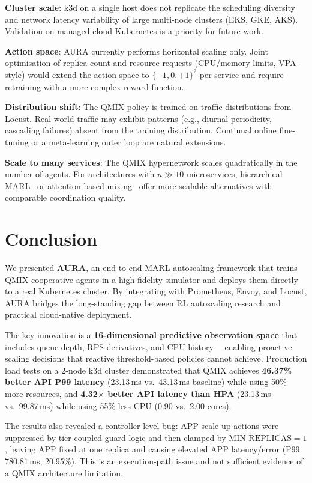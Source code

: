 \documentclass[conference]{IEEEtran}
\begin{document}
\textbf{Cluster scale}: k3d on a single host does not replicate
the scheduling diversity and network latency variability of large
multi-node clusters (EKS, GKE, AKS). Validation on managed cloud
Kubernetes is a priority for future work.

\textbf{Action space}: AURA currently performs horizontal scaling
only. Joint optimisation of replica count and resource requests
(CPU/memory limits, VPA-style) would extend the action space to
$\{-1,0,+1\}^2$ per service and require retraining with a more
complex reward function.

\textbf{Distribution shift}: The QMIX policy is trained on traffic
distributions from Locust. Real-world traffic may exhibit
patterns (e.g., diurnal periodicity, cascading failures) absent from
the training distribution. Continual online fine-tuning or a
meta-learning outer loop are natural extensions.

\textbf{Scale to many services}: The QMIX hypernetwork scales
quadratically in the number of agents. For architectures with
$n \gg 10$ microservices, hierarchical MARL~\cite{Pateria2021} or
attention-based mixing~\cite{Iqbal2019} offer more scalable
alternatives with comparable coordination quality.

\section{Conclusion}
\label{sec:conclusion}

We presented \textbf{AURA}, an end-to-end MARL autoscaling framework
that trains QMIX cooperative agents in a high-fidelity simulator and
deploys them directly to a real Kubernetes cluster. By integrating
with Prometheus, Envoy, and Locust, AURA bridges the long-standing
gap between RL autoscaling research and practical cloud-native
deployment.

The key innovation is a \textbf{16-dimensional predictive observation
space} that includes queue depth, RPS derivatives, and CPU history---
enabling proactive scaling decisions that reactive threshold-based
policies cannot achieve. Production load tests on a 2-node k3d cluster
demonstrated that QMIX achieves \textbf{46.37\% better API P99 latency}
(23.13\,ms vs.\ 43.13\,ms baseline) while using 50\% more resources,
and \textbf{4.32$\times$ better API latency than HPA} (23.13\,ms vs.\
99.87\,ms) while using 55\% less CPU (0.90 vs.\ 2.00 cores).

The results also revealed a controller-level bug: APP scale-up actions
were suppressed by tier-coupled guard logic and then clamped by
$\text{MIN\_REPLICAS}=1$, leaving APP fixed at one replica and causing
elevated APP latency/error (P99 780.81\,ms, 20.95\%). This is an
execution-path issue and not sufficient evidence of a QMIX architecture
limitation.
\end{document}
